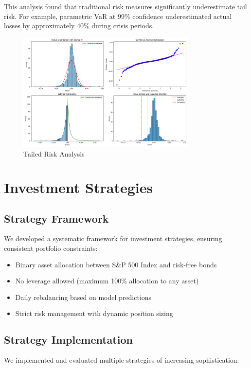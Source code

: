 \documentclass[13pt]{article}
\begin{document}
This analysis found that traditional risk measures significantly underestimate tail risk. For example, parametric VaR at 99\% confidence underestimated actual losses by approximately 40\% during crisis periods.
\begin{figure}[htbp]
	\centering
	\includegraphics[width=0.8\textwidth]{../results/catastrophe/tail_risk_analysis.png}
	\caption{Tailed Risk Analysis}
	\label{fig:tailed_risk}
\end{figure}

\section{Investment Strategies}
\subsection{Strategy Framework}
We developed a systematic framework for investment strategies, ensuring consistent portfolio constraints:

\begin{itemize}
	\item Binary asset allocation between S\&P 500 Index and risk-free bonds
	\item No leverage allowed (maximum 100\% allocation to any asset)
	\item Daily rebalancing based on model predictions
	\item Strict risk management with dynamic position sizing
\end{itemize}

\subsection{Strategy Implementation}
We implemented and evaluated multiple strategies of increasing sophistication:
\end{document}

